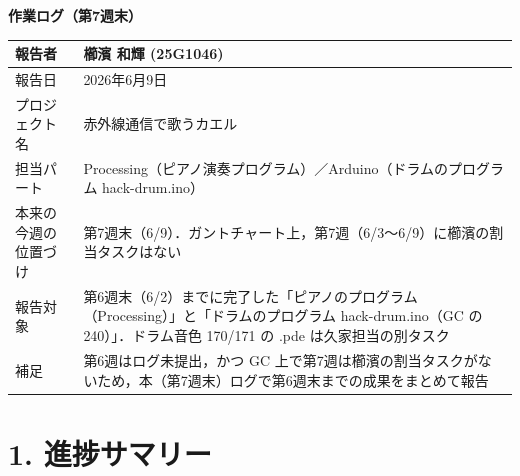 \documentclass[a4paper,11pt]{ltjsarticle}
\providecommand{\％}{\%}
\begin{document}
\begin{center}
    {\LARGE \textbf{作業ログ（第7週末）}}\\[1em]
\end{center}

\begin{tabular}{|p{4cm}|p{10cm}|}
\hline
報告者 & 櫛濱 和輝 (25G1046)\\
\hline
報告日 & 2026年6月9日\\
\hline
プロジェクト名 & 赤外線通信で歌うカエル\\
\hline
担当パート & Processing（ピアノ演奏プログラム）／Arduino（ドラムのプログラム hack-drum.ino）\\
\hline
本来の今週の位置づけ & 第7週末（6/9）．ガントチャート上，第7週（6/3〜6/9）に櫛濱の割当タスクはない\\
\hline
報告対象 & 第6週末（6/2）までに完了した「ピアノのプログラム（Processing）」と「ドラムのプログラム hack-drum.ino（GC の 240）」．ドラム音色 170/171 の .pde は久家担当の別タスク\\
\hline
補足 & 第6週はログ未提出，かつ GC 上で第7週は櫛濱の割当タスクがないため，本（第7週末）ログで第6週末までの成果をまとめて報告\\
\hline
\end{tabular}

\vspace{1em}

\section{1. 進捗サマリー}
\end{document}
